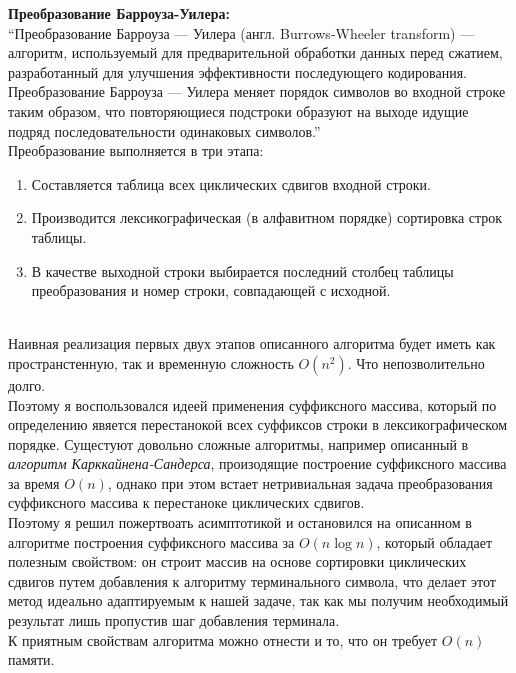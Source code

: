 {\large\bfseries Преобразование Барроуза-Уилера:} \\
\enquote{Преобразование Барроуза — Уилера (англ. Burrows-Wheeler transform) — алгоритм, используемый для предварительной обработки данных перед сжатием, разработанный для улучшения эффективности последующего кодирования. Преобразование Барроуза — Уилера меняет порядок символов во входной строке таким образом, что повторяющиеся подстроки образуют на выходе идущие подряд последовательности одинаковых символов.} \cite{bwt} \\

Преобразование выполняется в три этапа:
\begin{enumerate}
    \item Составляется таблица всех циклических сдвигов входной строки.
    \item Производится лексикографическая (в алфавитном порядке) сортировка строк таблицы.
    \item В качестве выходной строки выбирается последний столбец таблицы преобразования и номер строки, совпадающей с исходной.
\end{enumerate} \\

Наивная реализация первых двух этапов описанного алгоритма будет иметь как пространстенную, так и временную сложность $O(n^2)$. Что непозволительно долго.\\
Поэтому я воспользовался идеей применения суффиксного массива, который по определению явяется перестанокой всех суффиксов строки в лексикографическом порядке. Сущестуют довольно сложные алгоритмы, например описанный в \cite{suf} {\it алгоритм Карккайнена-Сандерса}, произодящие построение суффиксного массива за время $O(n)$, однако при этом встает нетривиальная задача преобразования суффиксного массива к перестаноке циклических сдвигов. \\
Поэтому я решил пожертвоать асимптотикой и остановился на описанном в \cite{emax} алгоритме построения суффиксного массива за $O(n\log{n})$, который обладает полезным свойством: он строит массив на основе сортировки циклических сдвигов путем добавления к алгоритму терминального символа, что делает этот метод идеально адаптируемым к нашей задаче, так как мы получим необходимый результат лишь пропустив шаг добавления терминала. \\
К приятным свойствам алгоритма можно отнести и то, что он требует $O(n)$ памяти. \\ 

